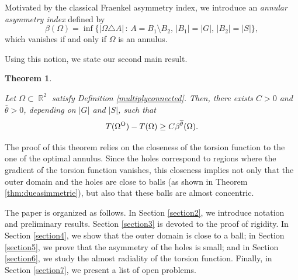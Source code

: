 \documentclass[oneside,a4paper,11pt,notitlepage]{article}
\newcommand{\abs}[1]{{\left|#1\right|}}
\theoremstyle{definition}
\theoremstyle{plain}
\newtheorem{theorem}{Theorem}[section]
\theoremstyle{definition}
\DeclareMathOperator{\R}{\mathbb{R}}
\newcommand{\OO}{\text{\normalfont  O}}
\begin{document}
Motivated by the classical Fraenkel asymmetry index, we introduce an \emph{annular asymmetry index} defined by
$$
\beta(\Omega) =\inf \{\abs{\Omega \triangle A} \, : \, A=B_1 \setminus B_2, \, \abs{B_1}= \abs{G} , \, \abs{B_2} = \abs{S}\},$$
which vanishes if and only if $\Omega$ is an annulus.

Using this notion, we state our second main result.
\begin{theorem}\label{thm:anellia}

 Let $\Omega\subset\R^2$ satisfy Definition \ref{multiplyconnected}. Then, there exists $C>0$ and $\overline{\theta}>0$, depending on $\abs{G}$ and $\abs{S}$, such that 
	\begin{equation*}
		T(\Omega^\OO)-T(\Omega) \geq C \beta^{\overline{\theta}}(\Omega).
	\end{equation*}
\end{theorem}


The proof of this theorem relies on the closeness of the torsion function to the one of the optimal annulus. Since the holes correspond to regions where the gradient of the torsion function vanishes, this closeness implies not only that the outer domain and the holes are close to balls (as shown in Theorem \ref{thm:dueasimmetrie}), but also that these balls are almost concentric.

The paper is organized as follows. In Section \ref{section2}, we introduce notation and preliminary results. Section \ref{section3} is devoted to the proof of rigidity. In Section \ref{section4}, we show that the outer domain is close to a ball; in Section \ref{section5}, we prove that the asymmetry of the holes is small; and in Section \ref{section6}, we study the almost radiality of the torsion function. Finally, in Section \ref{section7}, we present a list of open problems.
\end{document}
